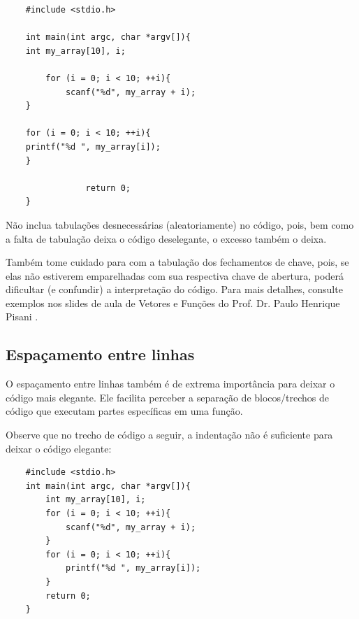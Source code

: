 \documentclass[12pt]{article}
\newcommand\tab[1][1cm]{\hspace*{#1}}
\begin{document}
\hspace{0.25cm}
\begin{lstlisting}
    #include <stdio.h>
    
    int main(int argc, char *argv[]){
    int my_array[10], i;
        
        for (i = 0; i < 10; ++i){
            scanf("%d", my_array + i);
    }
        
    for (i = 0; i < 10; ++i){
    printf("%d ", my_array[i]);
    }
        
                return 0;
    }
\end{lstlisting}

\hspace{0.25cm}
\begin{tcolorbox}[colback=yellow!5!white,colframe=yellow!75!black,title=Atenção!]
  \par\tab Não inclua tabulações desnecessárias (aleatoriamente) no código, pois, bem como a falta de tabulação deixa o código deselegante, o excesso também o deixa.
  \par\tab Também tome cuidado para com a tabulação dos fechamentos de chave, pois, se elas não estiverem emparelhadas com sua respectiva chave de abertura, poderá dificultar (e confundir) a interpretação do código. Para mais detalhes, consulte exemplos nos slides de aula de Vetores e Funções do Prof. Dr. Paulo Henrique Pisani \cite{presentation:pe_vet_func}.
\end{tcolorbox}

\subsection{Espaçamento entre linhas}

\par\tab O espaçamento entre linhas também é de extrema importância para deixar o código mais elegante. Ele facilita perceber a separação de blocos/trechos de código que executam partes específicas em uma função.

\par\tab Observe que no trecho de código a seguir, a indentação não é suficiente para deixar o código elegante:

\hspace{0.25cm}
\begin{lstlisting}
    #include <stdio.h>
    int main(int argc, char *argv[]){
        int my_array[10], i;
        for (i = 0; i < 10; ++i){
            scanf("%d", my_array + i);
        }
        for (i = 0; i < 10; ++i){
            printf("%d ", my_array[i]);
        }
        return 0;
    }
\end{lstlisting}
\end{document}
